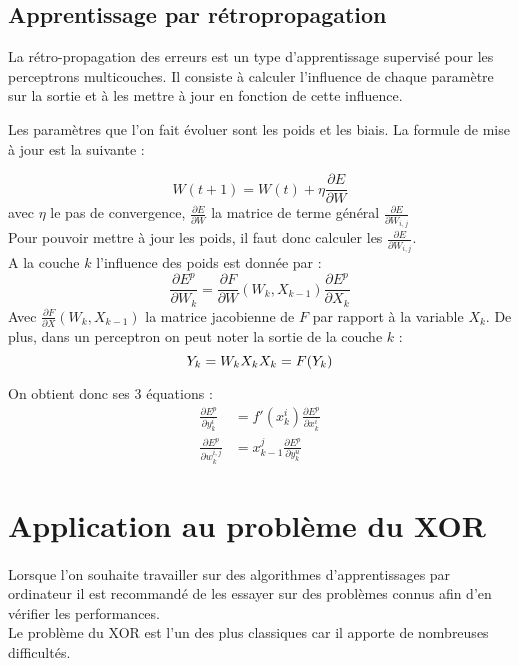 



\subsection{Apprentissage par rétropropagation}


La rétro-propagation des erreurs est un type d’apprentissage supervisé pour les perceptrons multicouches. Il consiste à calculer l’influence de chaque paramètre sur la sortie et à les mettre à jour en fonction de cette influence.

Les paramètres que l’on fait évoluer sont les poids et les biais.
La formule de mise à jour est la suivante :

\[
W(t+1) = W(t) + \eta \frac{\partial E}{\partial W} 
\]
avec $\eta$ le pas de convergence, $\frac{\partial E}{\partial W} $ la matrice de terme général $\frac{\partial E}{\partial W_{i,j}} $\\
Pour pouvoir mettre à jour les poids, il faut donc calculer les $\frac{\partial E}{\partial W_{i,j}} $.\\
A la couche $k$ l'influence des poids est donnée par : 
\[
	\frac{\partial E^p}{\partial W _k} = \frac{\partial F}{\partial W}(W_k, X_{k-1})\frac{\partial E^p}{\partial X_k}
\]
Avec $\frac{\partial F}{\partial X }(W_k, X_{k-1})$ la matrice jacobienne de $F$ par rapport à la variable $X_k$. De plus, dans un perceptron on peut noter la sortie de la couche $k$ : 
\[
Y_k = W_k X_k \\
X_k = F(Y_k)
\]

On obtient donc ses 3 équations : 
\begin{align*}
\frac{\partial E^p}{\partial y_k^i} &= f'(x_k^i)\frac{\partial E^p}{\partial x_k^i} \\
\frac{\partial E^p}{\partial w_k^{i,j}}&= x^j_{k-1} \frac{\partial E^p}{\partial y_k^u}
\end{align*}
\section{Application au problème du XOR}

\paragraph*{}
Lorsque l'on souhaite travailler sur des algorithmes d'apprentissages par ordinateur il est recommandé de les essayer sur des problèmes connus afin d'en vérifier les performances. \\
Le problème du XOR est l'un des plus classiques car il apporte de nombreuses difficultés.\\

